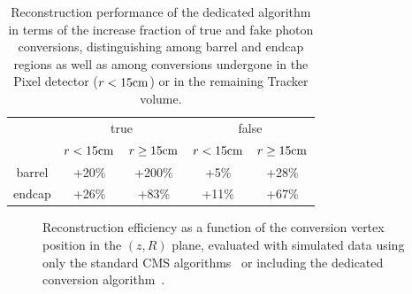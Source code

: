 \documentclass[a4paper]{jpconf}
\begin{document}
\begin{table}[htdp]
\caption{Reconstruction performance of the dedicated algorithm in terms of the increase fraction of true and fake photon conversions, distinguishing among barrel and endcap regions as well as among conversions undergone in the Pixel detector ($r < 15 \rm cm$) or in the remaining Tracker volume.
}
\begin{center}
\begin{tabular}{c|c|c|c|c}
& \multicolumn{2}{c}{true} & \multicolumn{2}{|c}{false}  \\
& $r < 15 \rm cm$ & $r \ge 15 \rm cm$ & $r < 15 \rm cm$ & $r \ge 15 \rm cm$ \\
\hline
barrel & +20\% & +200\% & +5\% & +28\% \\
\hline
endcap & +26\% & +83\% & +11\% & +67\% 
\end{tabular}
\end{center}
\label{tab:perfTable}
\end{table}%

\begin{figure}[h]
\centering
{}
\caption{Reconstruction efficiency as a function of the conversion vertex position in the $(z,R)$ plane, evaluated with simulated data using only the standard CMS algorithms~  or including the dedicated conversion algorithm~. }
\label{fig:RZCoverage}
\end{figure}
\end{document}
